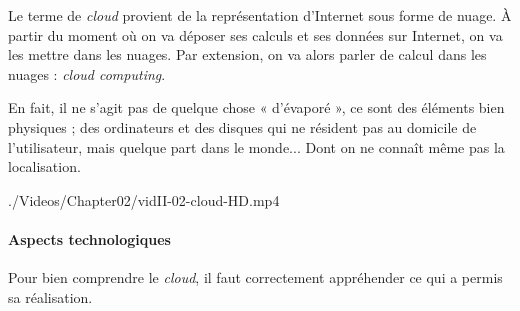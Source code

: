 Le terme de \textit{cloud} provient de la représentation d'Internet sous forme de nuage. À partir du moment où on va déposer ses calculs et ses données sur Internet, on va les mettre dans les nuages. Par extension, on va alors parler de calcul dans les nuages : \textit{cloud computing}.

En fait, il ne s'agit pas de quelque chose « d'évaporé », ce sont des éléments bien physiques ; des ordinateurs et des disques qui ne résident pas au domicile de l'utilisateur, mais quelque part dans le monde... Dont on ne connaît même pas la localisation.

\begin{marginvideo}
	[\label{vid:II.4}\textup{Cloud computing}.]%
		{./Videos/Chapter02/vidII-02-cloud-HD.mp4}%
\end{marginvideo}

\paragraph*{Aspects technologiques} Pour bien comprendre le \textit{cloud}, il faut correctement appréhender ce qui a permis sa réalisation. 

